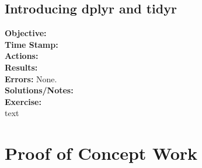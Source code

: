 \documentclass{article}
\begin{document}
\begin{FlushLeft}
\subsection{Introducing dplyr and tidyr}
\textbf{Objective: }\\ 
\textbf{Time Stamp:} \\
\textbf{Actions:} \\
\textbf{Results:}\\
\textbf{Errors:} None.\\
\textbf{Solutions/Notes:}\\
\vspace{5mm}
\textbf{Exercise: }\\ 
text\\

\pagebreak

\section{Proof of Concept Work}


\end{FlushLeft}
\end{document}
